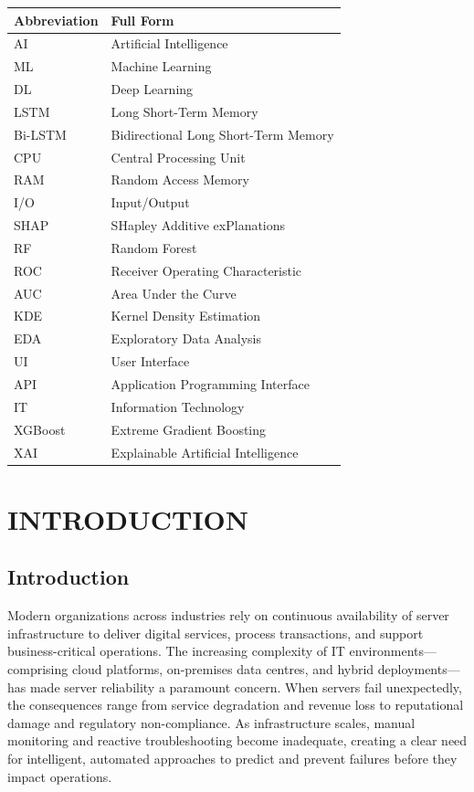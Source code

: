 \documentclass[12pt,letterpaper]{report}
\begin{document}
\begin{longtable}{ll}
\toprule
\textbf{Abbreviation} & \textbf{Full Form} \\
\midrule
\endhead
AI & Artificial Intelligence \\
ML & Machine Learning \\
DL & Deep Learning \\
LSTM & Long Short-Term Memory \\
Bi-LSTM & Bidirectional Long Short-Term Memory \\
CPU & Central Processing Unit \\
RAM & Random Access Memory \\
I/O & Input/Output \\
SHAP & SHapley Additive exPlanations \\
RF & Random Forest \\
ROC & Receiver Operating Characteristic \\
AUC & Area Under the Curve \\
KDE & Kernel Density Estimation \\
EDA & Exploratory Data Analysis \\
UI & User Interface \\
API & Application Programming Interface \\
IT & Information Technology \\
XGBoost & Extreme Gradient Boosting \\
XAI & Explainable Artificial Intelligence \\
\bottomrule
\end{longtable}

\newpage


\cleardoublepage
{}
\setcounter{page}{1}

\chapter{INTRODUCTION}

\section{Introduction}

Modern organizations across industries rely on continuous availability of server infrastructure to deliver digital services, process transactions, and support business-critical operations. The increasing complexity of IT environments---comprising cloud platforms, on-premises data centres, and hybrid deployments---has made server reliability a paramount concern. When servers fail unexpectedly, the consequences range from service degradation and revenue loss to reputational damage and regulatory non-compliance. As infrastructure scales, manual monitoring and reactive troubleshooting become inadequate, creating a clear need for intelligent, automated approaches to predict and prevent failures before they impact operations.
\end{document}
